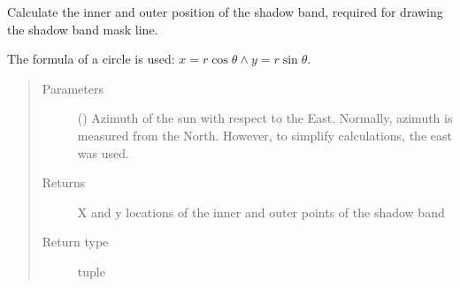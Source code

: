 \documentclass[letterpaper,10pt,english]{sphinxmanual}
\begin{document}
\begin{fulllineitems}
\label{\detokenize{createmask:createmask.calculate_band_position}}
Calculate the inner and outer position of the shadow band, required for drawing the shadow band mask line.

The formula of a circle is used: \(x = r \cos{\theta} \wedge y = r \sin{\theta}\).
\begin{quote}\begin{description}
\item[{Parameters}] \leavevmode
{} () \textendash{} Azimuth of the sun with respect to the East. Normally, azimuth is measured from the North. However,
to simplify calculations, the east was used.

\item[{Returns}] \leavevmode
X and y locations of the inner and outer points of the shadow band

\item[{Return type}] \leavevmode
tuple

\end{description}\end{quote}

\end{fulllineitems}

\end{document}
